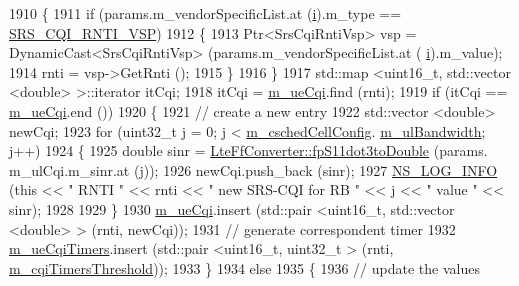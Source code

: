 \begin{DoxyCode}
1910           \{
1911             \textcolor{keywordflow}{if} (params.m\_vendorSpecificList.at (\hyperlink{bernuolliDistribution_8m_a6f6ccfcf58b31cb6412107d9d5281426}{i}).m\_type == \hyperlink{lte-vendor-specific-parameters_8h_a3b5e6e766032ab4a8e374a1cfd237a26}{SRS\_CQI\_RNTI\_VSP})
1912               \{
1913                 Ptr<SrsCqiRntiVsp> vsp = DynamicCast<SrsCqiRntiVsp> (params.m\_vendorSpecificList.at (
      \hyperlink{bernuolliDistribution_8m_a6f6ccfcf58b31cb6412107d9d5281426}{i}).m\_value);
1914                 rnti = vsp->GetRnti ();
1915               \}
1916           \}
1917         std::map <uint16\_t, std::vector <double> >::iterator itCqi;
1918         itCqi = \hyperlink{classns3_1_1FdMtFfMacScheduler_a5111c284868ab2a71c868fff681dbc0b}{m\_ueCqi}.find (rnti);
1919         \textcolor{keywordflow}{if} (itCqi == \hyperlink{classns3_1_1FdMtFfMacScheduler_a5111c284868ab2a71c868fff681dbc0b}{m\_ueCqi}.end ())
1920           \{
1921             \textcolor{comment}{// create a new entry}
1922             std::vector <double> newCqi;
1923             \textcolor{keywordflow}{for} (uint32\_t j = 0; j < \hyperlink{classns3_1_1FdMtFfMacScheduler_a9f2e3c6bfae8bfc266a84f64e5937ac8}{m\_cschedCellConfig}.
      \hyperlink{structns3_1_1FfMacCschedSapProvider_1_1CschedCellConfigReqParameters_a5ab5b102878e6e7e7727a14af4a64d2f}{m\_ulBandwidth}; j++)
1924               \{
1925                 \textcolor{keywordtype}{double} sinr = \hyperlink{classns3_1_1LteFfConverter_aa5d8c2a8f988dbd63da91818c18666eb}{LteFfConverter::fpS11dot3toDouble} (params.
      m\_ulCqi.m\_sinr.at (j));
1926                 newCqi.push\_back (sinr);
1927                 \hyperlink{group__logging_gafbd73ee2cf9f26b319f49086d8e860fb}{NS\_LOG\_INFO} (\textcolor{keyword}{this} << \textcolor{stringliteral}{" RNTI "} << rnti << \textcolor{stringliteral}{" new SRS-CQI for RB  "} << j << \textcolor{stringliteral}{" value
       "} << sinr);
1928 
1929               \}
1930             \hyperlink{classns3_1_1FdMtFfMacScheduler_a5111c284868ab2a71c868fff681dbc0b}{m\_ueCqi}.insert (std::pair <uint16\_t, std::vector <double> > (rnti, newCqi));
1931             \textcolor{comment}{// generate correspondent timer}
1932             \hyperlink{classns3_1_1FdMtFfMacScheduler_a673838e77ceb0404b1379674e14802e1}{m\_ueCqiTimers}.insert (std::pair <uint16\_t, uint32\_t > (rnti, 
      \hyperlink{classns3_1_1FdMtFfMacScheduler_a2594d67e25a125c89b90a5eba5e46cc9}{m\_cqiTimersThreshold}));
1933           \}
1934         \textcolor{keywordflow}{else}
1935           \{
1936             \textcolor{comment}{// update the values}

\end{DoxyCode}
